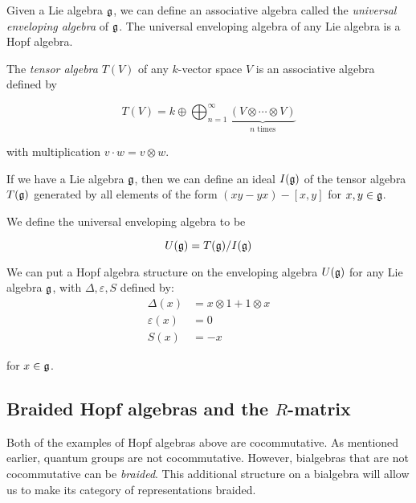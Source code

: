 \begin{example}
    \label{example:UEA}
    Given a Lie algebra $\mathfrak{g}$, we can define an associative algebra
    called the \emph{universal enveloping algebra} of $\mathfrak{g}$. The
    universal enveloping algebra of any Lie algebra is a Hopf algebra.

    The \emph{tensor algebra} $T(V)$ of any $k$-vector space $V$ is an associative
    algebra defined by

    \begin{equation}
        T(V) = k \oplus \bigoplus_{n=1}^\infty \underbrace{(V \otimes \cdots \otimes V)}_{\text{$n$ times}}
    \end{equation}

    with multiplication $v \cdot w = v \otimes w$.

    If we have a Lie algebra $\mathfrak{g}$, then we can define an ideal
    $I(\mathfrak{g})$ of the tensor algebra $T(\mathfrak{g})$ generated by all
    elements of the form $(xy - yx) - \left[ x,y \right]$ for $x,y \in
    \mathfrak{g}$.

    We define the universal enveloping algebra to be 

    \begin{equation}
        U(\mathfrak{g}) = T(\mathfrak{g}) / I(\mathfrak{g})
    \end{equation}

    We can put a Hopf algebra structure on the enveloping algebra
    $U(\mathfrak{g})$ for any Lie algebra $\mathfrak{g}$, with $\Delta,
    \varepsilon, S$ defined by: 
    \begin{align}
        \Delta(x) &= x \otimes 1 + 1 \otimes x \\
        \varepsilon(x) &= 0 \\
        S(x) &= -x  
    \end{align}

    for $x \in \mathfrak{g}$.

\end{example}

\subsection{Braided Hopf algebras and the $R$-matrix}
\label{subsection:R-matrix}

Both of the examples of Hopf algebras above are cocommutative. As mentioned
earlier, quantum groups are not cocommutative. However, bialgebras that are not
cocommutative can be \emph{braided}. This additional structure on a bialgebra
will allow us to make its category of representations braided.

